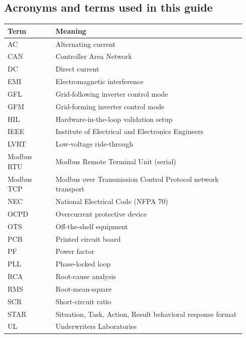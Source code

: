 \documentclass[11pt]{article}
\begin{document}
\subsection{Acronyms and terms used in this guide}
\begin{longtable}{p{0.19\linewidth}p{0.75\linewidth}}
\toprule
Term & Meaning \\
\midrule
AC & Alternating current \\
CAN & Controller Area Network \\
DC & Direct current \\
EMI & Electromagnetic interference \\
GFL & Grid-following inverter control mode \\
GFM & Grid-forming inverter control mode \\
HIL & Hardware-in-the-loop validation setup \\
IEEE & Institute of Electrical and Electronics Engineers \\
LVRT & Low-voltage ride-through \\
Modbus RTU & Modbus Remote Terminal Unit (serial) \\
Modbus TCP & Modbus over Transmission Control Protocol network transport \\
NEC & National Electrical Code (NFPA 70) \\
OCPD & Overcurrent protective device \\
OTS & Off-the-shelf equipment \\
PCB & Printed circuit board \\
PF & Power factor \\
PLL & Phase-locked loop \\
RCA & Root-cause analysis \\
RMS & Root-mean-square \\
SCR & Short-circuit ratio \\
STAR & Situation, Task, Action, Result behavioral response format \\
UL & Underwriters Laboratories \\
\bottomrule
\end{longtable}
\end{document}
